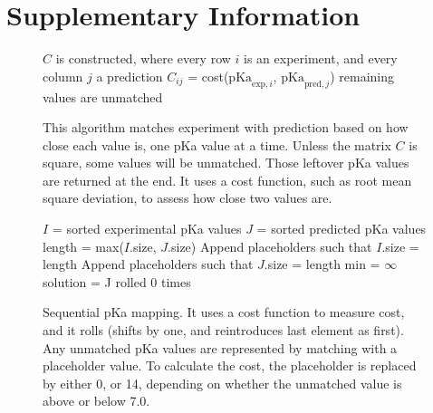\documentclass[9pt,lineno,final]{elife}
\newcommand{\pKa}{\mathrm{pKa}}
\begin{document}




\appendix

\section{Supplementary Information}



% 

\begin{figure}

\begin{algorithm}[H]
	\SetAlgoLined
	\caption{This algorithm matches experiment with prediction based on how close each value is, one pKa value at a time. Unless the matrix $C$ is square, some values will be unmatched. Those leftover pKa values are returned at the end. It uses a cost function, such as root mean square deviation, to assess how close two values are.}
	\label{alg:closest}
	 
	$C$ is constructed, where every row  $i$ is an experiment, and every column $j$ a prediction\;
	$C_{ij}$ = cost($\pKa_{\text{exp},i}$, $\pKa_{\text{pred},j}$)\;
	remaining values are unmatched\;
\label{alg:closest}
\end{algorithm}
\end{figure}

\begin{figure}
	\begin{algorithm}[H]
		\SetAlgoLined
		\caption{Sequential pKa mapping. It uses a cost function to measure cost, and it rolls (shifts by one, and reintroduces last element as first). Any unmatched pKa values are represented by matching with a placeholder value. To calculate the cost, the placeholder is replaced by either 0, or 14, depending on whether the unmatched value is above or below 7.0.}
		\label{alg:sequential}
		 
		$I$ = sorted experimental pKa values \;
		$J$ = sorted predicted pKa values \;
		length = max($I$.size, $J$.size)\;
		Append placeholders such that $I$.size = length \;
		Append placeholders such that $J$.size = length \;
		min = $\infty$\;
		solution = J rolled 0 times\;
	\end{algorithm}
\end{figure}
\end{document}
